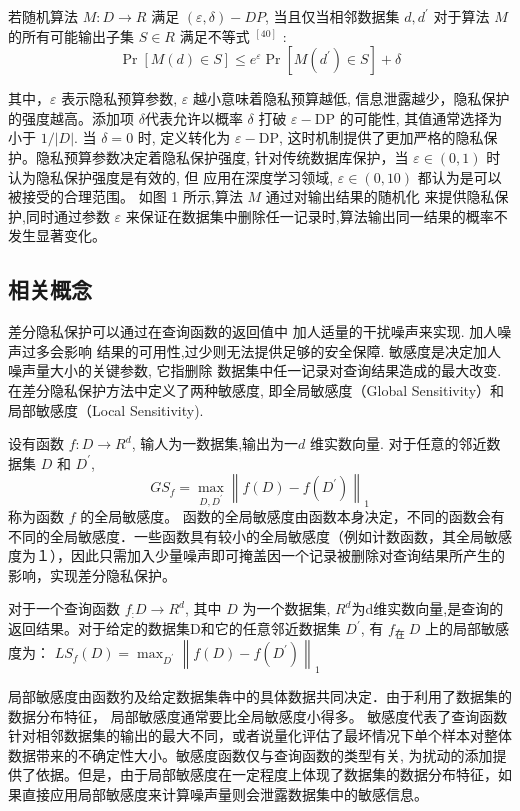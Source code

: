 \begin{define}[成立条件]\label{成立条件}

若随机算法 $M: D \rightarrow R$ 满足 $(\varepsilon, \delta)-D P$, 当且仅当相邻数据集 $d, d^{\prime}$ 对于算法 $M$ 的所有可能输出子集 $S \in R$ 满足不等式 $^{[40]}$ :
$$
\operatorname{Pr}[M(d) \in S] \leq e^{\varepsilon} \operatorname{Pr}\left[M\left(d^{\prime}\right) \in S\right]+\delta
$$

其中，$\varepsilon$ 表示隐私预算参数, $\varepsilon$ 越小意味着隐私预算越低, 信息泄露越少，隐私保护的强度越高。添加项 $\delta$代表允许以概率 $\delta$ 打破 $\varepsilon-\mathrm{DP}$ 的可能性, 其值通常选择为小于 $1 /|D|$. 当 $\delta=0$ 时, 定义转化为 $\varepsilon-\mathrm{DP}$, 这时机制提供了更加严格的隐私保护。隐私预算参数决定着隐私保护强度, 针对传统数据库保护，当 $\varepsilon \in(0,1)$ 时认为隐私保护强度是有效的, 但 应用在深度学习领域, $\varepsilon \in(0,10)$ 都认为是可以被接受的合理范围。
如图 1 所示,算法 $M$ 通过对输出结果的随机化 来提供隐私保护,同时通过参数 $\varepsilon$ 来保证在数据集中删除任一记录时,算法输出同一结果的概率不发生显著变化。
\end{define}

\subsection{相关概念}
差分隐私保护可以通过在查询函数的返回值中 加人适量的干扰噪声来实现. 加人噪声过多会影响 结果的可用性,过少则无法提供足够的安全保障. 敏感度是决定加人噪声量大小的关键参数, 它指删除 数据集中任一记录对查询结果造成的最大改变. 在差分隐私保护方法中定义了两种敏感度, 即全局敏感度（Global Sensitivity）和局部敏感度（Local Sensitivity).

\begin{define}[全局敏感度]\label{全局敏感度}
设有函数 $f: D \rightarrow R^{d}$, 输人为一数据集,输出为一$d$ 维实数向量. 对于任意的邻近数据集 $D$ 和 $D^{\prime}$,
$$
G S_{f}=\max _{D, D^{\prime}}\left\|f(D)-f\left(D^{\prime}\right)\right\|_{1}
$$
称为函数 $f$ 的全局敏感度。
函数的全局敏感度由函数本身决定，不同的函数会有不同的全局敏感度．一些函数具有较小的全局敏感度（例如计数函数，其全局敏感度为１），因此只需加入少量噪声即可掩盖因一个记录被删除对查询结果所产生的影响，实现差分隐私保护。
\end{define}

\begin{define}[局部敏感度]\label{局部敏感度}
对于一个查询函数 $f_{:} D \rightarrow R^{d}$, 其中 $D$ 为一个数据集, $R^{d}$为d维实数向量,是查询的返回结果。对于给定的数据集D和它的任意邻近数据集 $D^{\prime}$, 有 $f_{\text {在 }} D$ 上的局部敏感度为：
$L S_{f}(D)=\max _{D^{\prime}}\left\|f(D)-f\left(D^{\prime}\right)\right\|_{1}$

局部敏感度由函数犳及给定数据集犇中的具体数据共同决定．由于利用了数据集的数据分布特征， 局部敏感度通常要比全局敏感度小得多。
敏感度代表了查询函数针对相邻数据集的输出的最大不同，或者说量化评估了最坏情况下单个样本对整体数据带来的不确定性大小。敏感度函数仅与查询函数的类型有关, 为扰动的添加提供了依据。但是，由于局部敏感度在一定程度上体现了数据集的数据分布特征，如果直接应用局部敏感度来计算噪声量则会泄露数据集中的敏感信息。
\end{define}

